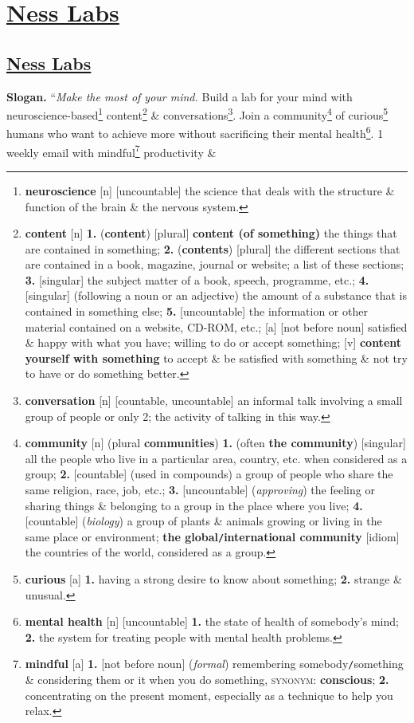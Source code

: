 \documentclass[oneside]{book}
\numberwithin{equation}{section}
\begin{document}

\chapter{\href{https://nesslabs.com/}{Ness Labs}}

\section{\href{https://nesslabs.com/}{Ness Labs}}
\textbf{Slogan.} ``\textit{Make the most of your mind.} Build a lab for your mind with neuroscience-based\footnote{\textbf{neuroscience} [n] [uncountable] the science that deals with the structure \& function of the brain \& the nervous system.} content\footnote{\textbf{content} [n] \textbf{1.} (\textbf{content}) [plural] \textbf{content (of something)} the things that are contained in something; \textbf{2.} (\textbf{contents}) [plural] the different sections that are contained in a book, magazine, journal or website; a list of these sections; \textbf{3.} [singular] the subject matter of a book, speech, programme, etc.; \textbf{4.} [singular] (following a noun or an adjective) the amount of a substance that is contained in something else; \textbf{5.} [uncountable] the information or other material contained on a website, CD-ROM, etc.; [a] [not before noun] satisfied \& happy with what you have; willing to do or accept something; [v] \textbf{content yourself with something} to accept \& be satisfied with something \& not try to have or do something better.} \& conversations\footnote{\textbf{conversation} [n] [countable, uncountable] an informal talk involving a small group of people or only 2; the activity of talking in this way.}. Join a community\footnote{\textbf{community} [n] (plural \textbf{communities}) \textbf{1.} (often \textbf{the community}) [singular] all the people who live in a particular area, country, etc. when considered as a group; \textbf{2.} [countable] (used in compounds) a group of people who share the same religion, race, job, etc.; \textbf{3.} [uncountable] (\textit{approving}) the feeling or sharing things \& belonging to a group in the place where you live; \textbf{4.} [countable] (\textit{biology}) a group of plants \& animals growing or living in the same place or environment; \textbf{the global\texttt{/}international community} [idiom] the countries of the world, considered as a group.} of curious\footnote{\textbf{curious} [a] \textbf{1.} having a strong desire to know about something; \textbf{2.} strange \& unusual.} humans who want to achieve more without sacrificing their mental health\footnote{\textbf{mental health} [n] [uncountable] \textbf{1.} the state of health of somebody's mind; \textbf{2.} the system for treating people with mental health problems.}. 1 weekly email with mindful\footnote{\textbf{mindful} [a] \textbf{1.} [not before noun] (\textit{formal}) remembering somebody\texttt{/}something \& considering them or it when you do something, \textsc{synonym}: \textbf{conscious}; \textbf{2.} concentrating on the present moment, especially as a technique to help you relax.} productivity \& 
\end{document}

